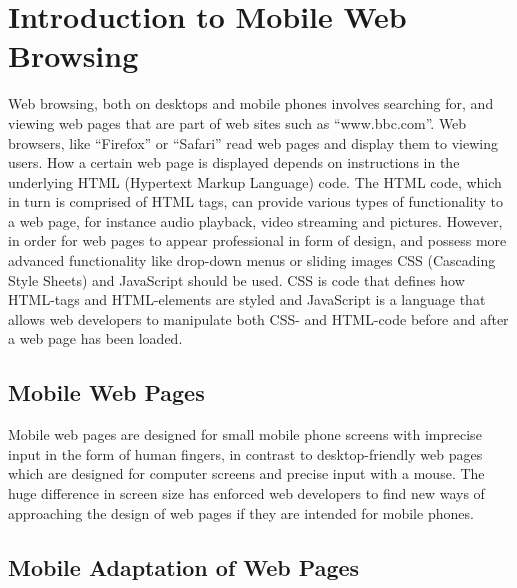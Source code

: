\section{Introduction to Mobile Web Browsing}

Web browsing, both on desktops and mobile phones involves searching for, and viewing web pages that are part of web sites such as “www.bbc.com”. Web browsers, like “Firefox” or “Safari” read web pages and display them to viewing users. How a certain web page is displayed depends on instructions in the underlying HTML (Hypertext Markup Language) code. The HTML code, which in turn is comprised of HTML tags, can provide various types of functionality to a web page, for instance audio playback, video streaming and pictures. However, in order for web pages to appear professional in form of design, and possess more advanced functionality like drop-down menus or sliding images CSS (Cascading Style Sheets) and JavaScript should be used. CSS is code that defines how HTML-tags and HTML-elements are styled and JavaScript is a language that allows web developers to manipulate both CSS- and HTML-code before and after a web page has been loaded.

\subsection{Mobile Web Pages}

Mobile web pages are designed for small mobile phone screens with imprecise input in the form of human fingers, in contrast to desktop-friendly web pages which are designed for computer screens and precise input with a mouse. The huge difference in screen size has enforced web developers to find new ways of approaching the design of web pages if they are intended for mobile phones.

\subsection{Mobile Adaptation of Web Pages}

